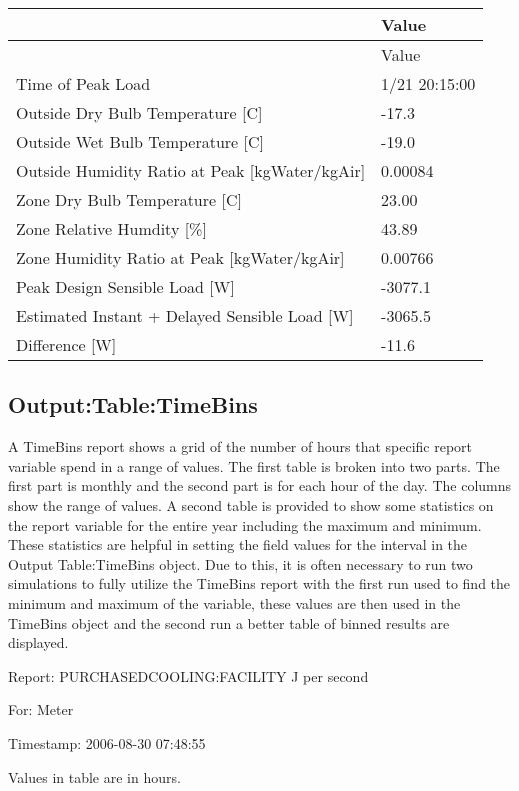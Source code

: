 \begin{longtable}[c]{@{}ll@{}}
\toprule 
 & Value \tabularnewline
\midrule
\endfirsthead

\toprule 
 & Value \tabularnewline
\midrule
\endhead

Time of Peak Load & 1/21 20:15:00 \tabularnewline
Outside Dry Bulb Temperature [C] & -17.3 \tabularnewline
Outside Wet Bulb Temperature [C] & -19.0 \tabularnewline
Outside Humidity Ratio at Peak [kgWater/kgAir] & 0.00084 \tabularnewline
Zone Dry Bulb Temperature [C] & 23.00 \tabularnewline
Zone Relative Humdity [\%] & 43.89 \tabularnewline
Zone Humidity Ratio at Peak [kgWater/kgAir] & 0.00766 \tabularnewline
Peak Design Sensible Load [W] & -3077.1 \tabularnewline
Estimated Instant + Delayed Sensible Load [W] & -3065.5 \tabularnewline
Difference [W] & -11.6 \tabularnewline
\bottomrule
\end{longtable}

\subsection{Output:Table:TimeBins}\label{outputtabletimebins}

A TimeBins report shows a grid of the number of hours that specific report variable spend in a range of values. The first table is broken into two parts. The first part is monthly and the second part is for each hour of the day. The columns show the range of values. A second table is provided to show some statistics on the report variable for the entire year including the maximum and minimum. These statistics are helpful in setting the field values for the interval in the Output Table:TimeBins object. Due to this, it is often necessary to run two simulations to fully utilize the TimeBins report with the first run used to find the minimum and maximum of the variable, these values are then used in the TimeBins object and the second run a better table of binned results are displayed.

Report: PURCHASEDCOOLING:FACILITY J per second

For: Meter

Timestamp: 2006-08-30 07:48:55

Values in table are in hours.

